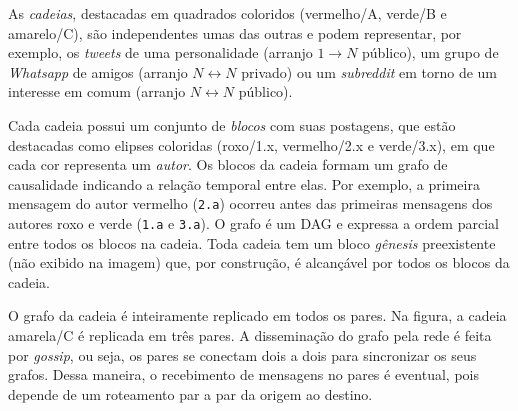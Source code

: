 \documentclass[12pt]{article}
\newcommand{\Xon} {$1{\rightarrow}N$\xspace}
\newcommand{\Xnn} {$N{\leftrightarrow}N$\xspace}
\begin{document}
As \emph{cadeias}, destacadas em quadrados coloridos (vermelho/A, verde/B e
amarelo/C), são independentes umas das outras e podem representar, por exemplo,
os \emph{tweets} de uma personalidade (arranjo \Xon público), um grupo de
\emph{Whatsapp} de amigos (arranjo \Xnn privado) ou um \emph{subreddit} em
torno de um interesse em comum (arranjo \Xnn público).

Cada cadeia possui um conjunto de \emph{blocos} com suas postagens, que estão
destacadas como elipses coloridas (roxo/1.x, vermelho/2.x e verde/3.x), em que
cada cor representa um \emph{autor}.
Os blocos da cadeia formam um grafo de causalidade indicando a relação temporal
entre elas.
Por exemplo, a primeira mensagem do autor vermelho (\texttt{2.a}) ocorreu antes
das primeiras mensagens dos autores roxo e verde (\texttt{1.a} e \texttt{3.a}).
O grafo é um DAG e expressa a ordem parcial entre todos os blocos na cadeia.
Toda cadeia tem um bloco \emph{gênesis} preexistente (não exibido na imagem)
que, por construção, é alcançável por todos os blocos da cadeia.

O grafo da cadeia é inteiramente replicado em todos os pares.
Na figura, a cadeia amarela/C é replicada em três pares.
A disseminação do grafo pela rede é feita por \emph{gossip}, ou seja, os pares
se conectam dois a dois para sincronizar os seus grafos.
Dessa maneira, o recebimento de mensagens no pares é eventual, pois depende de
um roteamento par a par da origem ao destino.
\end{document}
